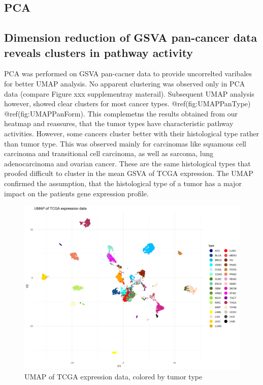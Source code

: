 \documentclass[
  parskip,
  oneside]{scrreprt}
\begin{document}
\hypertarget{pca-1}{%
\subsection{PCA}\label{pca-1}}

\hypertarget{dimension-reduction-of-gsva-pan-cancer-data-reveals-clusters-in-pathway-activity}{%
\subsection{Dimension reduction of GSVA pan-cancer data reveals clusters
in pathway
activity}\label{dimension-reduction-of-gsva-pan-cancer-data-reveals-clusters-in-pathway-activity}}

PCA was performed on GSVA pan-cacner data to provide uncorrelted
varibales for better UMAP analysis. No apparent clustering was observed
only in PCA data (compare Figure xxx supplementray materail). Subsequent
UMAP analysis however, showed clear clusters for most cancer types.
@ref(fig:UMAPPanType) @ref(fig:UMAPPanForm). This complemetns the
results obtained from our heatmap and reassures, that the tumor types
have characteristic pathway activities. However, some cancers cluster
better with their histological type rather than tumor type. This was
observed mainly for carcinomas like squamous cell carcinoma and
transitional cell carcinoma, as well as sarcoma, lung adenocarcinoma and
ovarian cancer. These are the same histological types that proofed
difficult to cluster in the mean GSVA of TCGA expression. The UMAP
confirmed the assumption, that the histological type of a tumor has a
major impact on the patients gene expression profile.

\begin{figure}

{\centering \includegraphics[width=0.5\linewidth]{figures/Pan Cancer UMAP} 

}

\caption{UMAP of TCGA expression data, colored by tumor type}\label{fig:UMAPPanType}
\end{figure}
\end{document}
